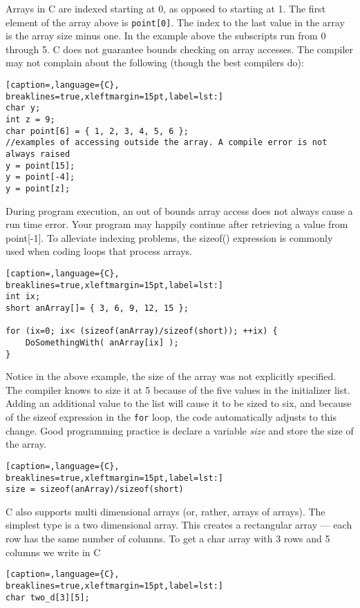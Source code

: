 Arrays in C are indexed starting at 0, as opposed to starting at 1. The first
element of the array above is \texttt{point[0]}. The index to the last value in
the array is the array size minus one.  In the example above the subscripts run
from 0 through 5. C does not guarantee bounds checking on array accesses. The
compiler may not complain about the following (though the best compilers do):
\lstset{basicstyle=\scriptsize, numbers=left, captionpos=b, tabsize=4}
\begin{lstlisting}[caption=,language={C},
breaklines=true,xleftmargin=15pt,label=lst:]
char y;
int z = 9;
char point[6] = { 1, 2, 3, 4, 5, 6 };
//examples of accessing outside the array. A compile error is not always raised
y = point[15];
y = point[-4];
y = point[z];
\end{lstlisting}

During program execution, an out of bounds array access does not always cause a
run time error. Your program may happily continue after retrieving a value from
point[-1]. To alleviate indexing problems, the sizeof() expression is commonly
used when coding loops that process arrays.
\lstset{basicstyle=\scriptsize, numbers=left, captionpos=b, tabsize=4}
\begin{lstlisting}[caption=,language={C},
breaklines=true,xleftmargin=15pt,label=lst:]
int ix;
short anArray[]= { 3, 6, 9, 12, 15 };
 
for (ix=0; ix< (sizeof(anArray)/sizeof(short)); ++ix) {
	DoSomethingWith( anArray[ix] );
}
\end{lstlisting}

Notice in the above example, the size of the array was not explicitly
specified. The compiler knows to size it at 5 because of the five values in the
initializer list. Adding an additional value to the list will cause it to be
sized to six, and because of the sizeof expression in the \texttt{for} loop,
the code automatically adjusts to this change. Good programming practice is
declare a variable \emph{size } and store the size of the array.
\lstset{basicstyle=\scriptsize, numbers=left, captionpos=b, tabsize=4}
\begin{lstlisting}[caption=,language={C},
breaklines=true,xleftmargin=15pt,label=lst:]
size = sizeof(anArray)/sizeof(short)
\end{lstlisting}

C also supports multi dimensional arrays (or, rather, arrays of arrays). The
simplest type is a two dimensional array. This creates a rectangular array ---
each row has the same number of columns. To get a char array with 3 rows and 5
columns we write in C
\lstset{basicstyle=\scriptsize, numbers=left, captionpos=b, tabsize=4}
\begin{lstlisting}[caption=,language={C},
breaklines=true,xleftmargin=15pt,label=lst:]
char two_d[3][5];
\end{lstlisting}

